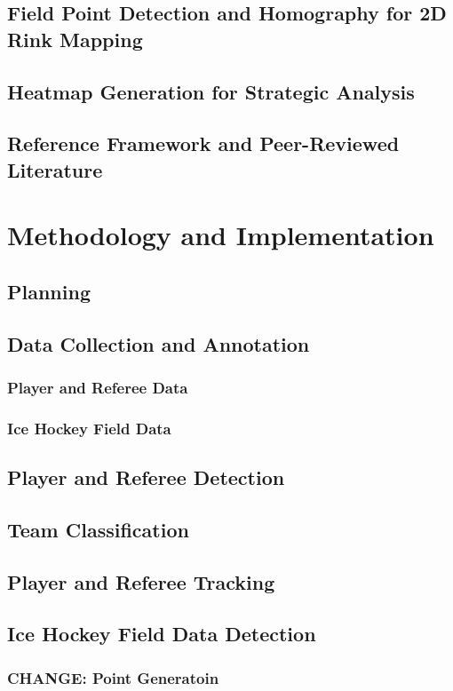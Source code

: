 \documentclass[12pt, letterpaper]{article}
\begin{document}
\subsection{Field Point Detection and Homography for 2D Rink Mapping}
\subsection{Heatmap Generation for Strategic Analysis}
\subsection{Reference Framework and Peer-Reviewed Literature}
\newpage

\section{Methodology and Implementation}

\subsection{Planning}
\subsection{Data Collection and Annotation}
\subsubsection{Player and Referee Data}
\subsubsection{Ice Hockey Field Data}
\subsection{Player and Referee Detection}
\subsection{Team Classification}
\subsection{Player and Referee Tracking}
\subsection{Ice Hockey Field Data Detection}
\subsubsection{\textbf{CHANGE}: Point Generatoin}
\end{document}
